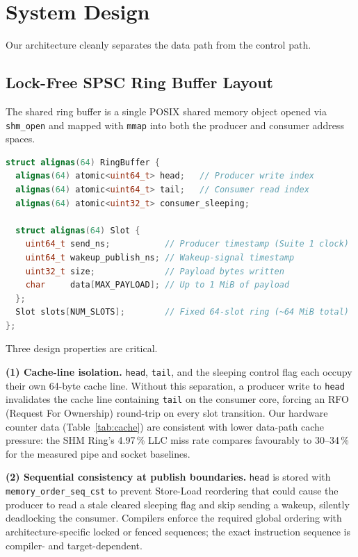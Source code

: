\documentclass[10pt,conference]{IEEEtran}
\begin{document}
\section{System Design}

Our architecture cleanly separates the data path from the control path.

\subsection{Lock-Free SPSC Ring Buffer Layout}

The shared ring buffer is a single POSIX shared memory object opened via
\texttt{shm\_open} and mapped with \texttt{mmap} into both the producer and
consumer address spaces.

\begin{lstlisting}[language=C++,caption={Cache-aligned SPSC RingBuffer (common.h)}]
struct alignas(64) RingBuffer {
  alignas(64) atomic<uint64_t> head;   // Producer write index
  alignas(64) atomic<uint64_t> tail;   // Consumer read index
  alignas(64) atomic<uint32_t> consumer_sleeping;

  struct alignas(64) Slot {
    uint64_t send_ns;           // Producer timestamp (Suite 1 clock)
    uint64_t wakeup_publish_ns; // Wakeup-signal timestamp
    uint32_t size;              // Payload bytes written
    char     data[MAX_PAYLOAD]; // Up to 1 MiB of payload
  };
  Slot slots[NUM_SLOTS];        // Fixed 64-slot ring (~64 MiB total)
};
\end{lstlisting}

Three design properties are critical.

\textbf{(1) Cache-line isolation.}  \texttt{head}, \texttt{tail}, and
the sleeping control flag each occupy their own 64-byte cache line.
Without this separation, a producer write to \texttt{head} invalidates
the cache line containing \texttt{tail} on the consumer core, forcing
an RFO (Request For Ownership) round-trip on every slot transition.  Our
hardware counter data (Table~\ref{tab:cache}) are consistent with lower
data-path cache pressure: the SHM Ring's 4.97\,\% LLC miss rate compares
favourably to 30--34\,\% for the measured pipe and socket baselines.

\textbf{(2) Sequential consistency at publish boundaries.}
\texttt{head} is stored with \texttt{memory\-\_order\-\_seq\-\_cst}
to prevent Store-Load reordering that could cause the producer to read
a stale cleared sleeping flag and skip sending a wakeup,
silently deadlocking the consumer.  Compilers enforce the required global
ordering with architecture-specific locked or fenced sequences; the exact
instruction sequence is compiler- and target-dependent.
\end{document}
